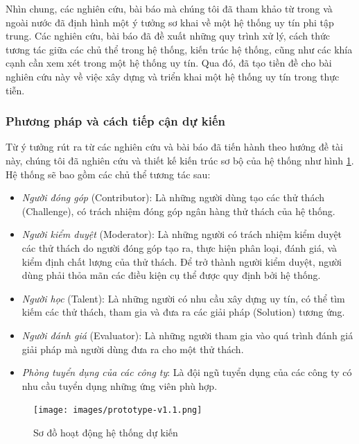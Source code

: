 \documentclass{article}[14pt]
\begin{document}
{  \par
  Nhìn chung, các nghiên cứu, bài báo mà chúng tôi đã tham khảo từ trong và ngoài nước đã định hình một ý tưởng sơ khai về một hệ thống uy tín phi tập trung. Các nghiên cứu, bài báo đã đề xuất những quy trình xử lý, cách thức tương tác giữa các chủ thể trong hệ thống, kiến trúc hệ thống, cũng như các khía cạnh cần xem xét trong một hệ thống uy tín. Qua đó, đã tạo tiền đề cho bài nghiên cứu này về việc xây dựng và triển khai một hệ thống uy tín trong thực tiễn.

  \subsubsection{Phương pháp và cách tiếp cận dự kiến}
  Từ ý tưởng rút ra từ các nghiên cứu và bài báo đã tiến hành theo hướng đề tài này, chúng tôi đã nghiên cứu và thiết kế kiến trúc sơ bộ của hệ thống như hình \ref{fig:architect}. Hệ thống sẽ bao gồm các chủ thể tương tác sau:
  \begin{itemize}
      \item \textit{Người đóng góp} (Contributor): Là những người dùng tạo các thử thách (Challenge), có trách nhiệm đóng góp ngân hàng thử thách của hệ thống.
      \item \textit{Người kiểm duyệt} (Moderator): Là những người có trách nhiệm kiểm duyệt các thử thách do người đóng góp tạo ra, thực hiện phân loại, đánh giá, và kiểm định chất lượng của thử thách. Để trở thành người kiểm duyệt, người dùng phải thỏa mãn các điều kiện cụ thể được quy định bởi hệ thống.
      \item \textit{Người học} (Talent): Là những người có nhu cầu xây dựng uy tín, có thể tìm kiếm các thử thách, tham gia và đưa ra các giải pháp (Solution) tương ứng.
      \item \textit{Người đánh giá} (Evaluator): Là những người tham gia vào quá trình đánh giá giải pháp mà người dùng đưa ra cho một thử thách.
      \item \textit{Phòng tuyển dụng của các công ty}: Là đội ngũ tuyển dụng của các công ty có nhu cầu tuyển dụng những ứng viên phù hợp.
  \end{itemize}

  \begin{figure} [h]
      \centering
      \texttt{[image: images/prototype-v1.1.png]}
      \caption{Sơ đồ hoạt động hệ thống dự kiến}
      \label{fig:architect}
  \end{figure}

}
\end{document}
